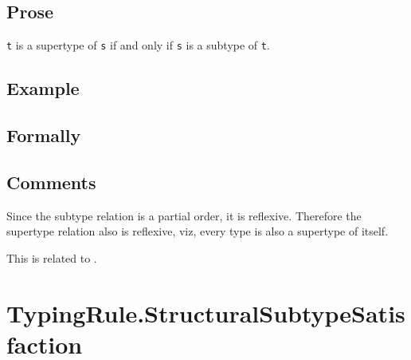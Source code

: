 \documentclass{book}
\newcommand\todocomment[1]{}
\begin{document}
  \subsection{Prose}
  \texttt{t} is a supertype of \texttt{s} if and only if \texttt{s} is a subtype of \texttt{t}.


\todocomment{
ROMAN: This rule doesn't exist in the code. Also, it is redundant, since it just applies to the same arguments in reverse order. I recommend removing this section.
}

  \subsection{Example}



\begin{emptyformal}
  \subsection{Formally}
\end{emptyformal}

\subsection{Comments}
  Since the subtype relation is a partial order, it is reflexive. Therefore the
  supertype relation also is reflexive, viz, every type is also a supertype of
  itself.

  This is related to .

\section{TypingRule.StructuralSubtypeSatisfaction\label{sec:TypingRule.SubtypeSatisfaction}}
\end{document}
